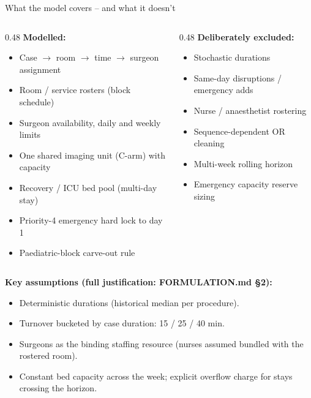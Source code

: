 \documentclass[10pt,aspectratio=169]{beamer}
\begin{document}
\begin{frame}{What the model covers -- and what it doesn't}
  \begin{columns}
    \begin{column}{0.48\textwidth}
      \textbf{Modelled:}
      \begin{itemize}\footnotesize
        \item Case $\to$ room $\to$ time $\to$ surgeon assignment
        \item Room / service rosters (block schedule)
        \item Surgeon availability, daily and weekly limits
        \item One shared imaging unit (C-arm) with capacity
        \item Recovery / ICU bed pool (multi-day stay)
        \item Priority-4 emergency hard lock to day 1
        \item Paediatric-block carve-out rule
      \end{itemize}
    \end{column}
    \begin{column}{0.48\textwidth}
      \textbf{Deliberately excluded:}
      \begin{itemize}\footnotesize
        \item Stochastic durations
        \item Same-day disruptions / emergency adds
        \item Nurse / anaesthetist rostering
        \item Sequence-dependent OR cleaning
        \item Multi-week rolling horizon
        \item Emergency capacity reserve sizing
      \end{itemize}
    \end{column}
  \end{columns}
  \vspace{0.5em}
  \textbf{Key assumptions (full justification: FORMULATION.md \S2):}
  \begin{itemize}\footnotesize
    \item Deterministic durations (historical median per procedure).
    \item Turnover bucketed by case duration: 15 / 25 / 40 min.
    \item Surgeons as the binding staffing resource (nurses assumed
      bundled with the rostered room).
    \item Constant bed capacity across the week; explicit overflow charge
      for stays crossing the horizon.
  \end{itemize}
\end{frame}
\end{document}
